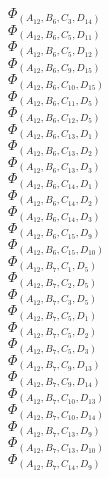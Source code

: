 \documentclass[14pt]{article}
\begin{document}
    $\Phi_{({A}_{12}, {B}_{6}, {C}_{3}, {D}_{14})}$ \\ 
    $\Phi_{({A}_{12}, {B}_{6}, {C}_{5}, {D}_{11})}$ \\ 
    $\Phi_{({A}_{12}, {B}_{6}, {C}_{5}, {D}_{12})}$ \\ 
    $\Phi_{({A}_{12}, {B}_{6}, {C}_{9}, {D}_{15})}$ \\ 
    $\Phi_{({A}_{12}, {B}_{6}, {C}_{10}, {D}_{15})}$ \\ 
    $\Phi_{({A}_{12}, {B}_{6}, {C}_{11}, {D}_{5})}$ \\ 
    $\Phi_{({A}_{12}, {B}_{6}, {C}_{12}, {D}_{5})}$ \\ 
    $\Phi_{({A}_{12}, {B}_{6}, {C}_{13}, {D}_{1})}$ \\ 
    $\Phi_{({A}_{12}, {B}_{6}, {C}_{13}, {D}_{2})}$ \\ 
    $\Phi_{({A}_{12}, {B}_{6}, {C}_{13}, {D}_{3})}$ \\ 
    $\Phi_{({A}_{12}, {B}_{6}, {C}_{14}, {D}_{1})}$ \\ 
    $\Phi_{({A}_{12}, {B}_{6}, {C}_{14}, {D}_{2})}$ \\ 
    $\Phi_{({A}_{12}, {B}_{6}, {C}_{14}, {D}_{3})}$ \\ 
    $\Phi_{({A}_{12}, {B}_{6}, {C}_{15}, {D}_{9})}$ \\ 
    $\Phi_{({A}_{12}, {B}_{6}, {C}_{15}, {D}_{10})}$ \\ 
    $\Phi_{({A}_{12}, {B}_{7}, {C}_{1}, {D}_{5})}$ \\ 
    $\Phi_{({A}_{12}, {B}_{7}, {C}_{2}, {D}_{5})}$ \\ 
    $\Phi_{({A}_{12}, {B}_{7}, {C}_{3}, {D}_{5})}$ \\ 
    $\Phi_{({A}_{12}, {B}_{7}, {C}_{5}, {D}_{1})}$ \\ 
    $\Phi_{({A}_{12}, {B}_{7}, {C}_{5}, {D}_{2})}$ \\ 
    $\Phi_{({A}_{12}, {B}_{7}, {C}_{5}, {D}_{3})}$ \\ 
    $\Phi_{({A}_{12}, {B}_{7}, {C}_{9}, {D}_{13})}$ \\ 
    $\Phi_{({A}_{12}, {B}_{7}, {C}_{9}, {D}_{14})}$ \\ 
    $\Phi_{({A}_{12}, {B}_{7}, {C}_{10}, {D}_{13})}$ \\ 
    $\Phi_{({A}_{12}, {B}_{7}, {C}_{10}, {D}_{14})}$ \\ 
    $\Phi_{({A}_{12}, {B}_{7}, {C}_{13}, {D}_{9})}$ \\ 
    $\Phi_{({A}_{12}, {B}_{7}, {C}_{13}, {D}_{10})}$ \\ 
    $\Phi_{({A}_{12}, {B}_{7}, {C}_{14}, {D}_{9})}$ \\ 
\end{document}
